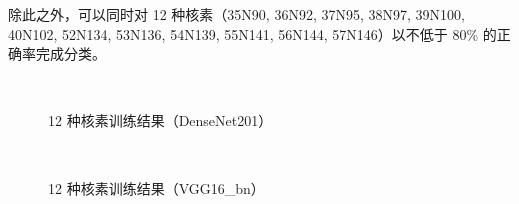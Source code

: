 \documentclass[AutoFakeBold]{LZUThesis}
\begin{document}
除此之外，可以同时对 12 种核素（35N90, 36N92, 37N95, 38N97, 39N100, 40N102, 52N134, 53N136, 54N139, 55N141, 56N144, 57N146）以不低于 80\% 的正确率完成分类。

\begin{figure}[H]
	\centering
	\\	
    \caption{12 种核素训练结果（DenseNet201）}
    \label{fig_learn12-densenet201}
\end{figure}

\begin{figure}[H]
	\centering
	\\	
    \caption{12 种核素训练结果（VGG16\_bn）}
    \label{fig_learn12-vgg16-bn}
\end{figure}
\end{document}

